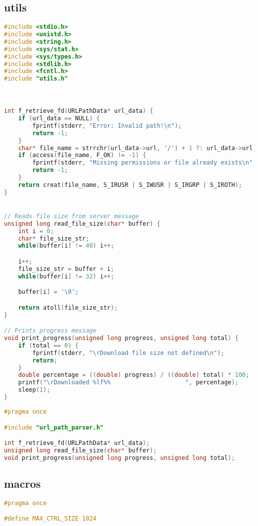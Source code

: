 \subsection{utils}
\begin{lstlisting}[language=C, caption=utils.c]
#include <stdio.h>
#include <unistd.h>
#include <string.h>
#include <sys/stat.h>
#include <sys/types.h>
#include <stdlib.h>
#include <fcntl.h>
#include "utils.h"



int f_retrieve_fd(URLPathData* url_data) {
    if (url_data == NULL) {
        fprintf(stderr, "Error: Invalid path!\n");
        return -1;
    }
    char* file_name = strrchr(url_data->url, '/') + 1 ?: url_data->url;
    if (access(file_name, F_OK) != -1) {
        fprintf(stderr, "Missing permissions or file already exists\n");
        return -1;
    }
    return creat(file_name, S_IRUSR | S_IWUSR | S_IRGRP | S_IROTH);
}


// Reads file size from server message
unsigned long read_file_size(char* buffer) {
    int i = 0;
    char* file_size_str;
    while(buffer[i] != 40) i++;

    i++;
    file_size_str = buffer + i;
    while(buffer[i] != 32) i++;

    buffer[i] = '\0';

    return atoll(file_size_str);
}

// Prints progress message
void print_progress(unsigned long progress, unsigned long total) {
    if (total == 0) {
        fprintf(stderr, "\rDownload file size not defined\n");
        return;
    }
    double percentage = ((double) progress) / ((double) total) * 100;
    printf("\rDownloaded %lf%%                     ", percentage);
    sleep(1);
}
\end{lstlisting}



\begin{lstlisting}[language=C, caption=utils.h]
#pragma once

#include "url_path_parser.h"

int f_retrieve_fd(URLPathData* url_data);
unsigned long read_file_size(char* buffer);
void print_progress(unsigned long progress, unsigned long total);
\end{lstlisting}


\subsection{macros}
\begin{lstlisting}[language=C, caption=macros.h]
#pragma once

#define MAX_CTRL_SIZE 1024
\end{lstlisting}

